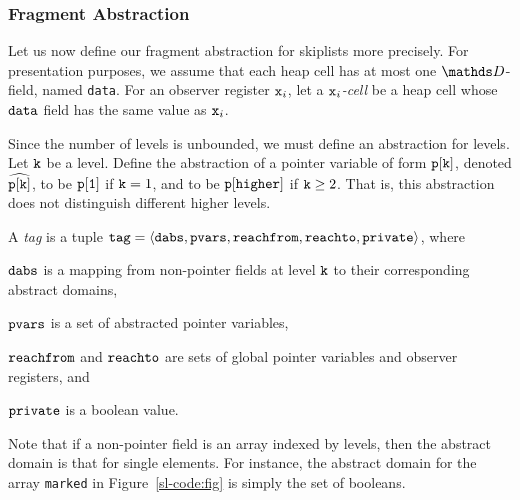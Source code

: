 \subsubsection{Fragment Abstraction}
Let us now define our fragment abstraction for skiplists more precisely.
For presentation purposes, we assume that each heap cell has at most one
$\ddomain$-field, named {\tt data}.
For an observer register $\mathtt{x}_i$, let a {\em $\mathtt{x}_i$-cell} be a heap cell whose
${\tt data}$ field has the same value as $\mathtt{x}_i$.

Since the number of levels is unbounded, we must define an abstraction for
levels.
Let ${\tt k}$ be a level.
Define the abstraction of a pointer variable of form $\tt p[k]$,
denoted $\widehat{\mathtt{p[k]}}$,
to be $\tt p[1]$ if ${\tt k} = 1$, and to be  $\tt p[higher]$
if ${\tt k} \geq 2$.
That is, this abstraction does not distinguish different higher levels.

A {\em tag} is a tuple $\mathtt{tag} = \left\langle\mathtt{dabs},\mathtt{pvars},\mathtt{reachfrom},\mathtt{reachto},\mathtt{private}\right\rangle$, where
\begin{inparaenum}[(i)]
\item
  $\mathtt{dabs}$ is a mapping from non-pointer fields at level ${\tt k}$
  to their corresponding abstract domains,
\item
  $\mathtt{pvars}$ is a set of abstracted pointer variables,
 \item
   $\mathtt{reachfrom}$ and $\mathtt{reachto}$ are sets of global pointer variables and observer registers, and
  \item $\mathtt{private}$ is a boolean value.
\end{inparaenum}
Note that if a non-pointer field is an array indexed by levels, then
the abstract domain is that for single elements. For instance, the abstract
domain for the array {\tt marked} in Figure~\ref{sl-code:fig} is simply the
set of booleans.

